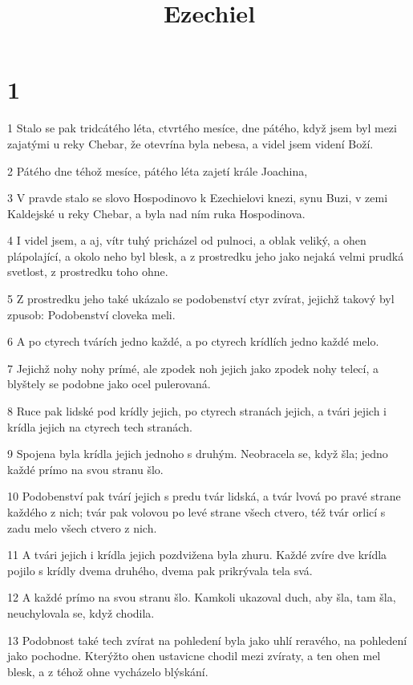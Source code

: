 

\title{Ezechiel}

\chapter{1}

\par 1 Stalo se pak tridcátého léta, ctvrtého mesíce, dne pátého, když jsem byl mezi zajatými u reky Chebar, že otevrína byla nebesa, a videl jsem videní Boží.
\par 2 Pátého dne téhož mesíce, pátého léta zajetí krále Joachina,
\par 3 V pravde stalo se slovo Hospodinovo k Ezechielovi knezi, synu Buzi, v zemi Kaldejské u reky Chebar, a byla nad ním ruka Hospodinova.
\par 4 I videl jsem, a aj, vítr tuhý pricházel od pulnoci, a oblak veliký, a ohen plápolající, a okolo neho byl blesk, a z prostredku jeho jako nejaká velmi prudká svetlost, z prostredku toho ohne.
\par 5 Z prostredku jeho také ukázalo se podobenství ctyr zvírat, jejichž takový byl zpusob: Podobenství cloveka meli.
\par 6 A po ctyrech tvárích jedno každé, a po ctyrech krídlích jedno každé melo.
\par 7 Jejichž nohy nohy prímé, ale zpodek noh jejich jako zpodek nohy telecí, a blyštely se podobne jako ocel pulerovaná.
\par 8 Ruce pak lidské pod krídly jejich, po ctyrech stranách jejich, a tvári jejich i krídla jejich na ctyrech tech stranách.
\par 9 Spojena byla krídla jejich jednoho s druhým. Neobracela se, když šla; jedno každé prímo na svou stranu šlo.
\par 10 Podobenství pak tvárí jejich s predu tvár lidská, a tvár lvová po pravé strane každého z nich; tvár pak volovou po levé strane všech ctvero, též tvár orlicí s zadu melo všech ctvero z nich.
\par 11 A tvári jejich i krídla jejich pozdvižena byla zhuru. Každé zvíre dve krídla pojilo s krídly dvema druhého, dvema pak prikrývala tela svá.
\par 12 A každé prímo na svou stranu šlo. Kamkoli ukazoval duch, aby šla, tam šla, neuchylovala se, když chodila.
\par 13 Podobnost také tech zvírat na pohledení byla jako uhlí reravého, na pohledení jako pochodne. Kterýžto ohen ustavicne chodil mezi zvíraty, a ten ohen mel blesk, a z téhož ohne vycházelo blýskání.

